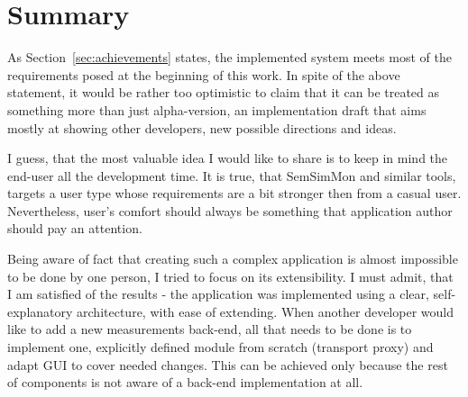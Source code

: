 %
\section{Summary}
\label{sec:summary}

As Section~\ref{sec:achievements} states, the implemented system meets most of the requirements posed at the beginning of this work. In spite of the above statement, it would be rather too optimistic to claim that it can be treated as something more than just alpha-version, an implementation draft that aims mostly at showing other developers, new possible directions and ideas.

I guess, that the most valuable idea I would like to share is to keep in mind the end-user all the development time. It is true, that SemSimMon and similar tools, targets a user type whose requirements are a bit stronger then from a casual user. Nevertheless, user\rq{}s comfort should always be something that application author should pay an attention.

Being aware of fact that creating such a complex application is almost impossible to be done by one person, I tried to focus on its extensibility. I must admit, that I am satisfied of the results - the application was implemented using a clear, self-explanatory architecture, with ease of extending. When another developer would like to add a new measurements back-end, all that needs to be done is to implement one, explicitly defined module from scratch (transport proxy) and adapt GUI to cover needed changes. This can be achieved only because the rest of components is not aware of a back-end implementation at all.

